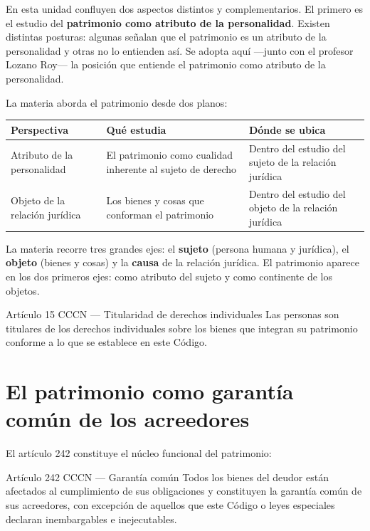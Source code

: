 \documentclass[12pt,oneside]{book}
\newenvironment{tabla}{%
    \par\medskip\begingroup\small\renewcommand{\arraystretch}{1.3}\noindent\ignorespaces
}{%
    \par\endgroup\medskip
}
\begin{document}
En esta unidad confluyen dos aspectos distintos y complementarios. El primero es el estudio del \textbf{patrimonio como atributo de la personalidad}. Existen distintas posturas: algunas señalan que el patrimonio es un atributo de la personalidad y otras no lo entienden así. Se adopta aquí ---junto con el profesor Lozano Roy--- la posición que entiende el patrimonio como atributo de la personalidad.

La materia aborda el patrimonio desde dos planos:

\begin{tabla}
\begin{tabularx}{\textwidth}{B{3.4cm}YY}
\toprule
Perspectiva & \textbf{Qué estudia} & \textbf{Dónde se ubica} \\
\midrule
Atributo de la personalidad & El patrimonio como cualidad inherente al sujeto de derecho & Dentro del estudio del sujeto de la relación jurídica \\
Objeto de la relación jurídica & Los bienes y cosas que conforman el patrimonio & Dentro del estudio del objeto de la relación jurídica \\
\bottomrule
\end{tabularx}
\end{tabla}

La materia recorre tres grandes ejes: el \textbf{sujeto} (persona humana y jurídica), el \textbf{objeto} (bienes y cosas) y la \textbf{causa} de la relación jurídica. El patrimonio aparece en los dos primeros ejes: como atributo del sujeto y como continente de los objetos.

\begin{norma}{Artículo 15 CCCN --- Titularidad de derechos individuales}
Las personas son titulares de los derechos individuales sobre los bienes que integran su patrimonio conforme a lo que se establece en este Código.
\end{norma}

\section{El patrimonio como garantía común de los acreedores}

El artículo 242 constituye el núcleo funcional del patrimonio:

\begin{norma}{Artículo 242 CCCN --- Garantía común}
Todos los bienes del deudor están afectados al cumplimiento de sus obligaciones y constituyen la garantía común de sus acreedores, con excepción de aquellos que este Código o leyes especiales declaran inembargables e inejecutables.
\end{norma}
\end{document}
